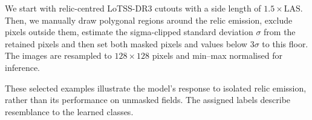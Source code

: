 We start with relic-centred LoTSS-DR3 cutouts with a side length of \(1.5\times\mathrm{LAS}\). Then, we manually draw polygonal regions around the relic emission, exclude pixels outside them, estimate the sigma-clipped standard deviation \(\sigma\) from the retained pixels and then set both masked pixels and values below \(3\sigma\) to this floor. The images are resampled to \(128\times128\) pixels and min--max normalised for inference.

These selected examples illustrate the model's response to isolated relic emission, rather than its performance on unmasked fields. The assigned labels describe resemblance to the learned classes.
